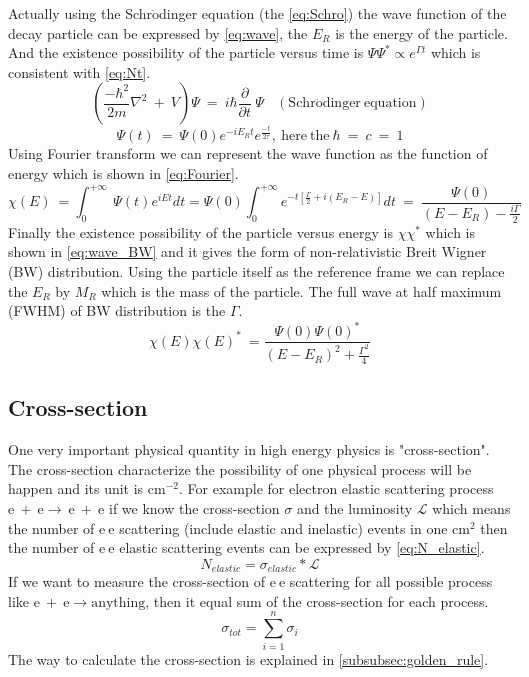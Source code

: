 Actually using the Schr$\mathrm{\ddot{o}}$dinger equation (the \ref{eq:Schro}) the wave function of the decay particle can be expressed by \ref{eq:wave}, the $E_{R}$ is the energy of the particle. And the existence possibility of the particle versus time is $\Psi\Psi^{\ast}\varpropto e^{\Gamma t}$ which is consistent with \ref{eq:Nt}.
\begin{equation}
(\frac{-\hbar^{2}}{2m}\nabla^{2}~+~ V)\Psi~=~i\hbar\frac{\partial}{\partial t}~\Psi ~~~~(\mathrm{Schr\ddot{o}dinger~equation})
\label{eq:Schro}
\end{equation}
\begin{equation}
\Psi(t)~=~\Psi(0)e^{-iE_{R}t}e^{\frac{-t}{2\tau}},~\mathrm{here~the}~\hbar~=~c~=~1
\label{eq:wave}
\end{equation}
Using Fourier transform we can represent the wave function as the function of energy which is shown in \ref{eq:Fourier}.
\begin{equation}
\chi(E)~=\int_{0}^{+\infty}~\Psi(t)e^{iEt}dt=\Psi(0)\int_{0}^{+\infty}e^{-t[\frac{\Gamma}{2}+i(E_{R}-E)]}dt~=~\frac{\Psi(0)}{(E-E_{R})-\frac{i\Gamma}{2}}
\label{eq:Fourier}
\end{equation}
Finally the existence possibility of the particle versus energy is $\chi\chi^{\ast}$ which is shown in \ref{eq:wave_BW} and it gives the form of non-relativistic Breit Wigner (BW) distribution. Using the particle itself as the reference frame we can replace the $E_{R}$ by $M_{R}$ which is the mass of the particle. The full wave at half maximum (FWHM) of BW distribution is the $\Gamma$.
\begin{equation}
\chi(E)\chi(E)^{\ast}~=\frac{\Psi(0)\Psi(0)^{\ast}}{(E-E_{R})^{2}+\frac{\Gamma^{2}}{4}}
\label{eq:wave_BW}
\end{equation}
\subsection{Cross-section}\label{subsubsec:Cross_section}
One very important physical quantity in high energy physics is "cross-section". The cross-section characterize the possibility of one physical process will be happen and its unit is $\mathrm{cm^{-2}}$. For example for electron elastic scattering process $\mathrm{e~+~e\rightarrow~e~+~e}$ if we know the cross-section $\sigma$ and the luminosity $\mathcal{L}$ which means the number of $\mathrm{e~e}$ scattering (include elastic and inelastic) events in one $\mathrm{cm^{2}}$ then the number of $\mathrm{e~e}$ elastic scattering events can be expressed by \ref{eq:N_elastic}.
\begin{equation}
N_{elastic}=\sigma_{elastic}*\mathcal{L}
\label{eq:N_elastic}
\end{equation}
If we want to measure the cross-section of $\mathrm{e~e}$ scattering for all possible process like $\mathrm{e~+~e\rightarrow anything}$, then it equal sum of the cross-section for each process.
\begin{equation}
\sigma_{tot}=\sum_{i=1}^{n}\sigma_{i}
\label{eq:sigma_tot}
\end{equation}
The way to calculate the cross-section is explained in \ref{subsubsec:golden_rule}.
